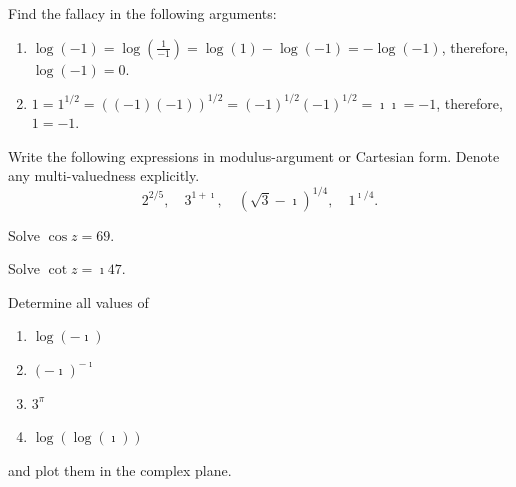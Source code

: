 {\begin{Exercise}
\end{Exercise}







\begin{Exercise}
  \label{exercise log-1 = 0}
  Find the fallacy in the following arguments:
  \begin{enumerate}
  \item
    $\log(-1) = \log \left( \frac{1}{-1} \right) 
    = \log(1) - \log(-1)
    = - \log(-1)$,
    therefore, $\log(-1) = 0$.
  \item
    $1 = 1^{1/2} = ((-1) (-1))^{1/2} = (-1)^{1/2}  (-1)^{1/2} = \imath \imath =  -1$, 
    therefore, $1 = -1$.
  \end{enumerate}

\end{Exercise}











\begin{Exercise}
  \label{exercise mod-arg cart log}
  Write the following expressions in modulus-argument or Cartesian form.
  Denote any multi-valuedness explicitly.
  \[
  2^{2/5}, \quad 3^{1 + \imath}, \quad \left( \sqrt{3} - \imath \right)^{1/4}, \quad 1^{\imath / 4}.
  \]

\end{Exercise}



\begin{Exercise}
  \label{exercise cosz = 69}
  Solve $\cos z = 69$.

\end{Exercise}



\begin{Exercise}
  \label{exercise cotz = i47}
  Solve $\cot z = \imath 47$.

\end{Exercise}





\begin{Exercise}
  \label{exercise log-i}
  Determine all values of 
  \begin{enumerate}
  \item
    $\log(-\imath)$ 
  \item
    $(-\imath)^{-\imath}$ 
  \item
    $3^{\pi}$
  \item
    $\log(\log(\imath))$
  \end{enumerate}
  and plot them in the complex plane.


\end{Exercise}}
